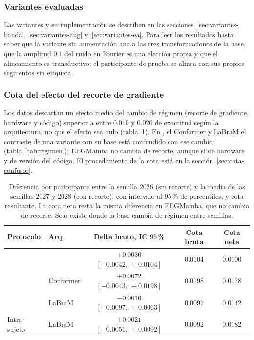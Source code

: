 \subsubsection{Variantes evaluadas}

Las variantes y su implementación se describen en las secciones~\ref{sec:variantes-banda},
\ref{sec:variantes-aug} y~\ref{sec:variantes-ea}. Para leer los resultados basta saber que la variante
sin aumentación anula las tres transformaciones de la base, que la amplitud $0.1$ del ruido en Fourier es
una elección propia y que el alineamiento es transductivo: el participante de prueba se alinea con sus
propios segmentos sin etiqueta.

\subsubsection{Cota del efecto del recorte de gradiente}
\label{sec:confusor}

Los datos descartan un efecto medio del cambio de régimen (recorte de gradiente, hardware y código)
superior a entre $0.010$ y $0.020$ de exactitud según la arquitectura, no que el efecto sea nulo
(tabla~\ref{tab:confusor}). En \eegnet{}, el Conformer y LaBraM el contraste de una variante con su base
está confundido con ese cambio (tabla~\ref{tab:regimen}); EEGMamba no cambia de recorte, aunque sí de
hardware y de versión del código. El procedimiento de la cota está en la
sección~\ref{sec:cota-confusor}.

\begin{table}[H]
\centering
\caption{Diferencia por participante entre la semilla $2026$ (sin recorte) y la media de las
semillas $2027$ y $2028$ (con recorte), con intervalo al $95$\,\% de percentiles, y cota resultante.
La cota neta resta la misma diferencia en EEGMamba, que no cambia de recorte. Solo existe donde la base cambia
de régimen entre semillas.}
\label{tab:confusor}
\small
\begin{tabular}{llccc}
\toprule
\textbf{Protocolo} & \textbf{Arq.} & Delta bruto, IC $95$\,\% & Cota bruta & Cota neta \\
\midrule
\loso{} & \eegnet{} & $+0.0030$ $[-0.0042,\ +0.0104]$ & 0.0104 & 0.0100 \\
\loso{} & Conformer & $+0.0072$ $[-0.0043,\ +0.0198]$ & 0.0198 & 0.0178 \\
\loso{} & LaBraM & $-0.0016$ $[-0.0097,\ +0.0063]$ & 0.0097 & 0.0142 \\
Intra-sujeto & LaBraM & $+0.0021$ $[-0.0051,\ +0.0092]$ & 0.0092 & 0.0182 \\
\bottomrule
\end{tabular}
\end{table}

